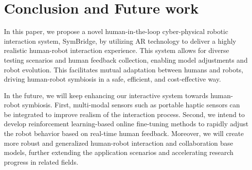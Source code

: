 \section{Conclusion and Future work}
\label{sec:conclusion}

In this paper, we propose a novel human-in-the-loop cyber-physical robotic interaction system, SymBridge, by utilizing AR technology to deliver a highly realistic human-robot interaction experience. 
This system allows for diverse testing scenarios and human feedback collection, enabling model adjustments and robot evolution. This facilitates mutual adaptation between humans and robots, driving human-robot symbiosis in a safe, efficient, and cost-effective way.



In the future, we will keep enhancing our interactive system towards human-robot symbiosis. First, multi-modal sensors such as portable haptic sensors can be integrated to improve realism of the interaction process. Second, we intend to develop reinforcement learning-based online fine-tuning methods to rapidly adjust the robot behavior based on real-time human feedback. Moreover, we will create more robust and generalized human-robot interaction and collaboration base models, further extending the application scenarios and accelerating research progress in related fields. 






